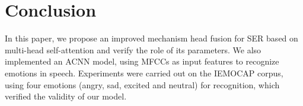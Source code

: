 \documentclass[10pt, conference, compsocconf]{IEEEtran}
\begin{document}
\section{Conclusion}
In this paper, we propose an improved mechanism head fusion for SER based on multi-head self-attention and verify the role of its parameters. We also implemented an ACNN model, using MFCCs as input features to recognize emotions in speech. Experiments were carried out on the IEMOCAP corpus, using four emotions (angry, sad, excited and neutral) for recognition, which verified the validity of our model.



%
%




%
%
%
%
%


%
%



\end{document}
